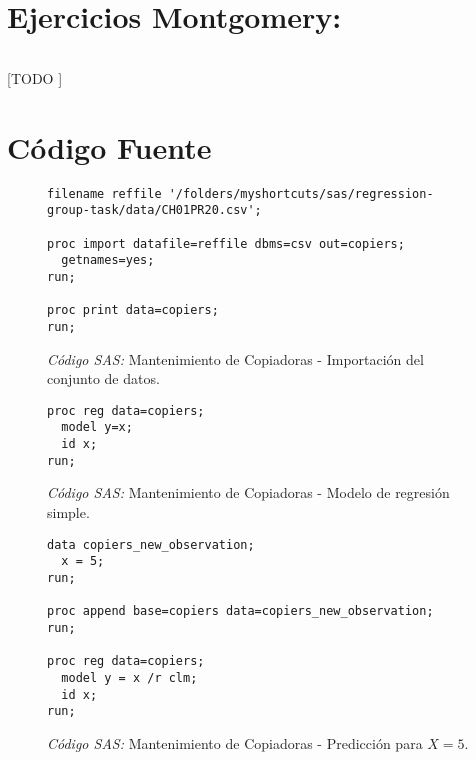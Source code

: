 \documentclass{article}
\begin{document}
  \part{Ejercicios Montgomery:}

    \paragraph{}
    [TODO ]


  \part{Código Fuente}

    \begin{figure}[!h]
      \centering
      \begin{verbatim}
filename reffile '/folders/myshortcuts/sas/regression-group-task/data/CH01PR20.csv';

proc import datafile=reffile dbms=csv out=copiers;
  getnames=yes;
run;

proc print data=copiers;
run;
      \end{verbatim}
      \caption{\emph{Código SAS:} Mantenimiento de Copiadoras - Importación del conjunto de datos.}
      \label{code:sas-copiers-1}
    \end{figure}


    \begin{figure}[!h]
      \centering
      \begin{verbatim}
proc reg data=copiers;
  model y=x;
  id x;
run;
      \end{verbatim}
      \caption{\emph{Código SAS:} Mantenimiento de Copiadoras - Modelo de regresión simple.}
      \label{code:sas-copiers-2}
    \end{figure}

    \begin{figure}[!h]
      \centering
      \begin{verbatim}
data copiers_new_observation;
  x = 5;
run;

proc append base=copiers data=copiers_new_observation;
run;

proc reg data=copiers;
  model y = x /r clm;
  id x;
run;
      \end{verbatim}
      \caption{\emph{Código SAS:} Mantenimiento de Copiadoras - Predicción para $X = 5$.}
      \label{code:sas-copiers-2}
    \end{figure}

  \nocite{rano2017}
  \nocite{sas}
  \nocite{neter1996applied}
  \nocite{montgomery2012introduction}

  
  
\end{document}
